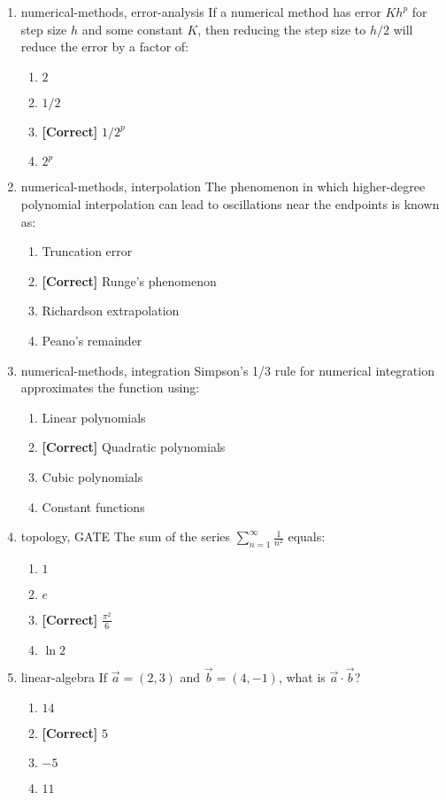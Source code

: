 \documentclass{article}
\newenvironment{problem}{\item}{}
\newcommand{\choice}{\item}
\newcommand{\correctchoice}{\item \textbf{[Correct] }}
\newcommand{\tags}[1]{#1} %
\begin{document}
\begin{enumerate}
        \begin{problem}
            \tags{numerical-methods, error-analysis}
            If a numerical method has error $Kh^p$ for step size $h$ and some constant $K$, then reducing the step size to $h/2$ will reduce the error by a factor of:
            \begin{enumerate}
                \choice $2$
                \choice $1/2$
                \correctchoice $1/2^p$
                \choice $2^p$
            \end{enumerate}
        \end{problem}
        
        \begin{problem}
            \tags{numerical-methods, interpolation}
            The phenomenon in which higher-degree polynomial interpolation can lead to oscillations near the endpoints is known as:
            \begin{enumerate}
                \choice Truncation error
                \correctchoice Runge's phenomenon
                \choice Richardson extrapolation
                \choice Peano's remainder
            \end{enumerate}
        \end{problem}
        
        \begin{problem}
            \tags{numerical-methods, integration}
            Simpson's 1/3 rule for numerical integration approximates the function using:
            \begin{enumerate}
                \choice Linear polynomials
                \correctchoice Quadratic polynomials
                \choice Cubic polynomials
                \choice Constant functions
            \end{enumerate}
        \end{problem}

        \begin{problem}
            \tags{topology, GATE}
            The sum of the series $\sum_{n=1}^{\infty} \frac{1}{n^2}$ equals:
            \begin{enumerate}
                \choice $1$
                \choice $e$
                \correctchoice $\frac{\pi^2}{6}$
                \choice $\ln 2$
            \end{enumerate}
        \end{problem}

        \begin{problem}
            \tags{linear-algebra}
            If $\vec{a} = (2, 3)$ and $\vec{b} = (4, -1)$, what is $\vec{a} \cdot \vec{b}$?
                \begin{enumerate}
                \choice $14$
                \correctchoice $5$
                \choice $-5$
                \choice $11$
            \end{enumerate}
        \end{problem}


\end{enumerate}
\end{document}
